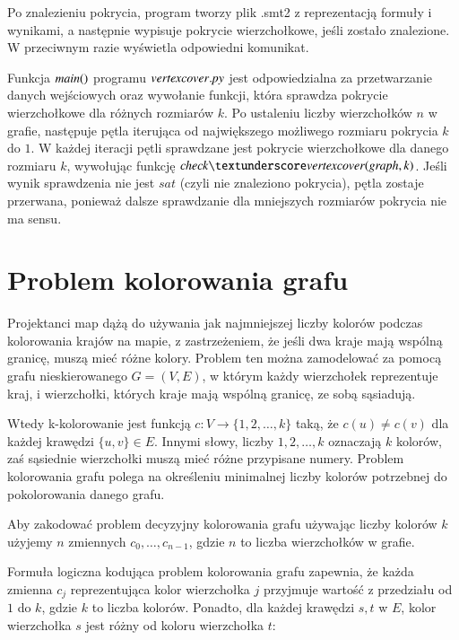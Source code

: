 Po znalezieniu pokrycia, program tworzy plik .smt2 z reprezentacją formuły i wynikami, a następnie wypisuje pokrycie wierzchołkowe, jeśli zostało znalezione. W przeciwnym razie wyświetla odpowiedni komunikat.



Funkcja ${\mathit{main()}}$ programu ${\mathit{vertexcover.py}}$ jest odpowiedzialna za przetwarzanie danych wejściowych oraz wywołanie funkcji, która sprawdza pokrycie wierzchołkowe dla różnych rozmiarów $k$. Po ustaleniu liczby wierzchołków $n$ w grafie, następuje pętla iterująca od największego możliwego rozmiaru pokrycia $k$ do $1$. W każdej iteracji pętli sprawdzane jest pokrycie wierzchołkowe dla danego rozmiaru $k$, wywołując funkcję $\checkvertexcover$. Jeśli wynik sprawdzenia nie jest $sat$ (czyli nie znaleziono pokrycia), pętla zostaje przerwana, ponieważ dalsze sprawdzanie dla mniejszych rozmiarów pokrycia nie ma sensu.




\section{Problem kolorowania grafu}
Projektanci map dążą do używania jak najmniejszej liczby kolorów podczas
kolorowania krajów na mapie, z zastrzeżeniem, że jeśli dwa kraje mają wspólną
granicę, muszą mieć różne kolory. Problem ten można zamodelować za pomocą grafu
nieskierowanego $G = (V, E)$, w którym każdy wierzchołek reprezentuje kraj,
i wierzchołki, których kraje mają wspólną granicę, ze sobą sąsiadują.

Wtedy k-kolorowanie jest funkcją $c\colon V \to \{1, 2, …, k\}$ taką, że $c(u) \neq c(v)$ dla każdej krawędzi $\{u, v\} \in E$. 
Innymi słowy, liczby $1, 2, …, k$
oznaczają \(k\) kolorów, zaś sąsiednie wierzchołki muszą mieć różne przypisane
numery. Problem kolorowania grafu polega na określeniu minimalnej liczby kolorów
potrzebnej do pokolorowania danego grafu.

Aby zakodować problem decyzyjny kolorowania grafu używając liczby kolorów $k$ użyjemy $n$ zmiennych $c_0,\ldots,c_{n-1}$, gdzie $n$ to liczba wierzchołków w grafie.

Formuła logiczna kodująca problem kolorowania grafu zapewnia, że każda zmienna \(c_j\) reprezentująca kolor wierzchołka \(j\) przyjmuje wartość z przedziału od \(1\) do \(k\), gdzie \(k\) to liczba kolorów. Ponadto, dla każdej krawędzi ${s, t}$ w \(E\), kolor wierzchołka \(s\) jest różny od koloru wierzchołka \(t\):


